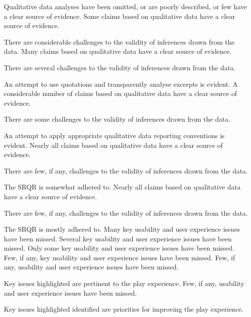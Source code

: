 \documentclass{../../../fal_assignment}
\begin{document}
\begin{markingrubric}
%
        \grade\fail 	Qualitative data analyses have been omitted, or are poorly described, or few have a clear source of evidence.
        \grade		Some claims based on qualitative data have a clear source of evidence.
	\par 		There are considerable challenges to the validity of inferences drawn from the data.
        \grade		Many claims based on qualitative data have a clear source of evidence.
        \par 		There are several challenges to the validity of inferences drawn from the data.
	\par 		An attempt to use quotations and transparently analyse excerpts is evident.
        \grade		A considerable number of claims based on qualitative data have a clear source of evidence.
        \par		There are some challenges to the validity of inferences drawn from the data.
        \par 		An attempt to apply appropriate qualitative data reporting conventions is evident.
        \grade		Nearly all claims based on qualitative data have a clear source of evidence.
        \par		There are few, if any, challenges to the validity of inferences drawn from the data.
        \par 		The SRQR is somewhat adhered to.
        \grade		Nearly all claims based on qualitative data have a clear source of evidence.
        \par		There are few, if any, challenges to the validity of inferences drawn from the data.
        \par		The SRQR is mostly adhered to.
%
        \grade\fail 	Many key usability and user experience issues have been missed.
        \grade		Several key usability and user experience issues have been missed.
        \grade		Only some key usability and user experience issues have been missed.
        \grade		Few, if any, key usability and user experience issues have been missed.
        \grade		Few, if any, usability and user experience issues have been missed.
        \par		Key issues highlighted are pertinent to the play experience.
        \grade		Few, if any, usability and user experience issues have been missed.
        \par		Key issues highlighted identified are priorities for improving the play experience.

\end{markingrubric}
\end{document}
